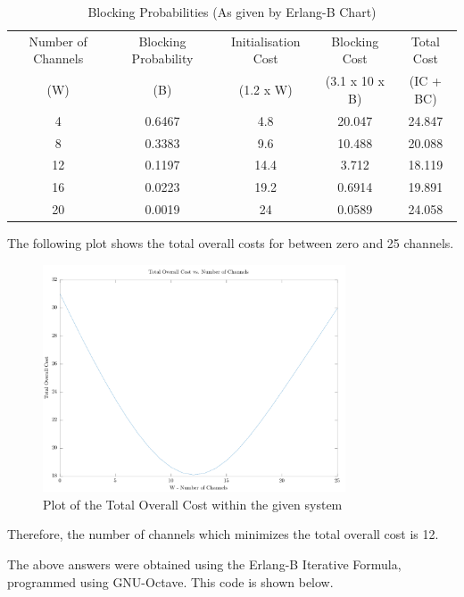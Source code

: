 \begin{table}[H]
	\centering
	\caption{Blocking Probabilities (As given by Erlang-B Chart)}
	\label{tab:erlang}
	\begin{tabular}{|c|c|c|c|c|}
	\hline
	Number of Channels & Blocking Probability
		     & Initialisation Cost & Blocking Cost
		     & Total Cost \\
	(W) & (B) & (1.2 x W) & (3.1 x 10 x B) & (IC + BC)\\
	\hline
	4 & 0.6467    & 4.8  & 20.047 & 24.847		\\
	8 & 0.3383    & 9.6  & 10.488 & 20.088 		\\
	12 & 0.1197   & 14.4 & 3.712  & 18.119		\\
	16 & 0.0223   & 19.2 & 0.6914 & 19.891		\\
	20 & 0.0019   & 24   & 0.0589 & 24.058		\\
	\hline
	\end{tabular}
\end{table}

The following plot shows the total overall costs for between zero and 25
channels.

\begin{figure}[H]
	\centering
	\includegraphics[width=0.8\textwidth]{code/Q5/Q5}
	\caption{Plot of the Total Overall Cost within the given system}
	\label{fig:code-Q5}
\end{figure}

Therefore, the number of channels which minimizes the total overall cost is 12.

The above answers were obtained using the Erlang-B Iterative Formula, programmed
using GNU-Octave. This code is shown below.



